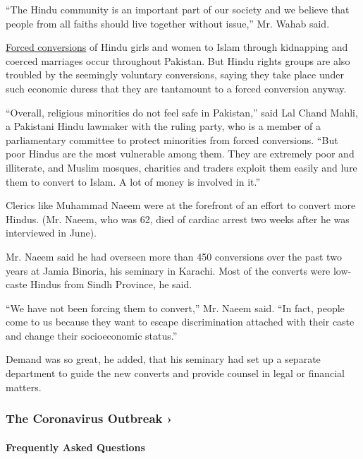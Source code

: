 ``The Hindu community is an important part of our society and we believe
that people from all faiths should live together without issue,'' Mr.
Wahab said.

\href{https://www.nytimes.com/2012/03/26/world/asia/pakistani-hindus-say-womans-conversion-to-islam-was-coerced.html}{Forced
conversions} of Hindu girls and women to Islam through kidnapping and
coerced marriages occur throughout Pakistan. But Hindu rights groups are
also troubled by the seemingly voluntary conversions, saying they take
place under such economic duress that they are tantamount to a forced
conversion anyway.

``Overall, religious minorities do not feel safe in Pakistan,'' said Lal
Chand Mahli, a Pakistani Hindu lawmaker with the ruling party, who is a
member of a parliamentary committee to protect minorities from forced
conversions. ``But poor Hindus are the most vulnerable among them. They
are extremely poor and illiterate, and Muslim mosques, charities and
traders exploit them easily and lure them to convert to Islam. A lot of
money is involved in it.''

Clerics like Muhammad Naeem were at the forefront of an effort to
convert more Hindus. (Mr. Naeem, who was 62, died of cardiac arrest two
weeks after he was interviewed in June).

Mr. Naeem said he had overseen more than 450 conversions over the past
two years at Jamia Binoria, his seminary in Karachi. Most of the
converts were low-caste Hindus from Sindh Province, he said.

``We have not been forcing them to convert,'' Mr. Naeem said. ``In fact,
people come to us because they want to escape discrimination attached
with their caste and change their socioeconomic status.''

Demand was so great, he added, that his seminary had set up a separate
department to guide the new converts and provide counsel in legal or
financial matters.

\href{https://www.nytimes.com/news-event/coronavirus?action=click\&pgtype=Article\&state=default\&region=MAIN_CONTENT_3\&context=storylines_faq}{}

\hypertarget{the-coronavirus-outbreak-}{%
\subsubsection{The Coronavirus Outbreak
›}\label{the-coronavirus-outbreak-}}

\hypertarget{frequently-asked-questions}{%
\paragraph{Frequently Asked
Questions}\label{frequently-asked-questions}}

